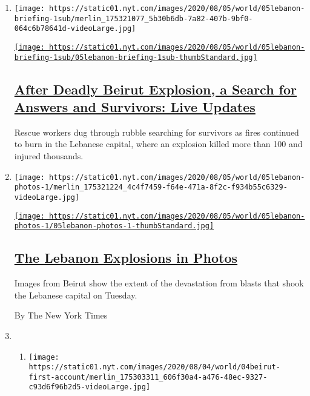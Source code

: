 \begin{enumerate}
\def\labelenumi{\arabic{enumi}.}
\item
  \texttt{[image: https://static01.nyt.com/images/2020/08/05/world/05lebanon-briefing-1sub/merlin\_175321077\_5b30b6db-7a82-407b-9bf0-064c6b78641d-videoLarge.jpg]}

  \href{/2020/08/05/world/middleeast/beirut-explosion.html}{\texttt{[image: https://static01.nyt.com/images/2020/08/05/world/05lebanon-briefing-1sub/05lebanon-briefing-1sub-thumbStandard.jpg]}}

  \hypertarget{after-deadly-beirut-explosion-a-search-for-answers-and-survivors-live-updates}{%
  \subsection{\texorpdfstring{\href{/2020/08/05/world/middleeast/beirut-explosion.html}{After
  Deadly Beirut Explosion, a Search for Answers and Survivors: Live
  Updates}}{After Deadly Beirut Explosion, a Search for Answers and Survivors: Live Updates}}\label{after-deadly-beirut-explosion-a-search-for-answers-and-survivors-live-updates}}

  Rescue workers dug through rubble searching for survivors as fires
  continued to burn in the Lebanese capital, where an explosion killed
  more than 100 and injured thousands.
\item
  \texttt{[image: https://static01.nyt.com/images/2020/08/05/world/05lebanon-photos-1/merlin\_175321224\_4c4f7459-f64e-471a-8f2c-f934b55c6329-videoLarge.jpg]}

  \href{/2020/08/04/world/middleeast/beirut-lebanon-explosions-photos.html}{\texttt{[image: https://static01.nyt.com/images/2020/08/05/world/05lebanon-photos-1/05lebanon-photos-1-thumbStandard.jpg]}}

  \hypertarget{the-lebanon-explosions-in-photos}{%
  \subsection{\texorpdfstring{\href{/2020/08/04/world/middleeast/beirut-lebanon-explosions-photos.html}{The
  Lebanon Explosions in
  Photos}}{The Lebanon Explosions in Photos}}\label{the-lebanon-explosions-in-photos}}

  Images from Beirut show the extent of the devastation from blasts that
  shook the Lebanese capital on Tuesday.

  By The New York Times
\item
  \begin{enumerate}
  \def\labelenumii{\arabic{enumii}.}
  \item
    \texttt{[image: https://static01.nyt.com/images/2020/08/04/world/04beirut-first-account/merlin\_175303311\_606f30a4-a476-48ec-9327-c93d6f96b2d5-videoLarge.jpg]}


\end{enumerate}
\end{enumerate}
